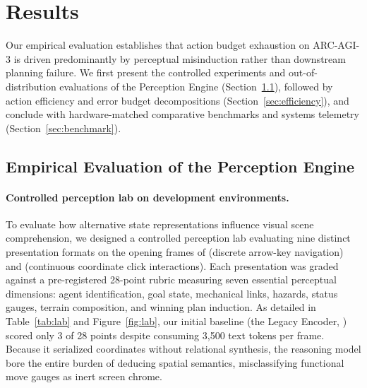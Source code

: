 \section{Results}
\label{sec:results}

Our empirical evaluation establishes that action budget exhaustion on ARC-AGI-3 is driven predominantly by perceptual misinduction rather than downstream planning failure. We first present the controlled experiments and out-of-distribution evaluations of the Perception Engine (Section~\ref{sec:lab_results}), followed by action efficiency and error budget decompositions (Section~\ref{sec:efficiency}), and conclude with hardware-matched comparative benchmarks and systems telemetry (Section~\ref{sec:benchmark}).

\subsection{Empirical Evaluation of the Perception Engine}
\label{sec:lab_results}

\paragraph{Controlled perception lab on development environments.}
To evaluate how alternative state representations influence visual scene comprehension, we designed a controlled perception lab evaluating nine distinct presentation formats on the opening frames of  (discrete arrow-key navigation) and  (continuous coordinate click interactions). Each presentation was graded against a pre-registered 28-point rubric measuring seven essential perceptual dimensions: agent identification, goal state, mechanical links, hazards, status gauges, terrain composition, and winning plan induction. As detailed in Table~\ref{tab:lab} and Figure~\ref{fig:lab}, our initial baseline (the Legacy Encoder, ) scored only 3 of 28 points despite consuming 3,500 text tokens per frame. Because it serialized coordinates without relational synthesis, the reasoning model bore the entire burden of deducing spatial semantics, misclassifying functional move gauges as inert screen chrome.

